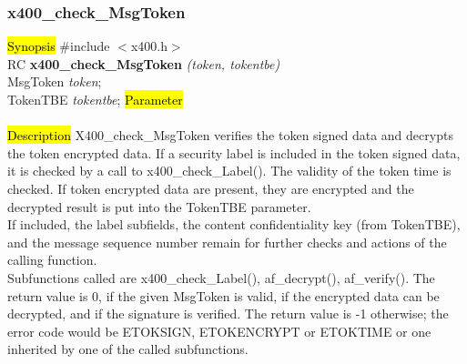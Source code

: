 \subsubsection{x400\_check\_MsgToken}
\label{x4_ck_MTok}
\hl{Synopsis}
\#include $<$x400.h$>$ \\ [1ex]
RC {\bf x400\_check\_MsgToken} {\em (token, tokentbe)} \\
MsgToken {\em *token}; \\
TokenTBE {\em *tokentbe};
\hl{Parameter}
 \\[1ex]
 \\[1ex]
\hl{Description}
X400\_check\_MsgToken verifies the token signed data and decrypts
the token encrypted data.
If a security label is included in the token signed data,
it is checked
by a call to x400\_check\_Label().
The validity of the token time is checked.
If token encrypted data are present, they are encrypted
and the decrypted result is put into the TokenTBE parameter.
\\
If included,
the label subfields, the content confidentiality key (from TokenTBE),
and the message sequence number
remain for further checks and actions of the calling function.
\\
Subfunctions called are x400\_check\_Label(), af\_decrypt(), af\_verify().
The return value is 0, if the given MsgToken is valid,
if the encrypted data can be decrypted,
and if the signature is  verified.
The return value is -1 otherwise;
the error code would be ETOKSIGN, ETOKENCRYPT or ETOKTIME
or one inherited by one of the called subfunctions.

